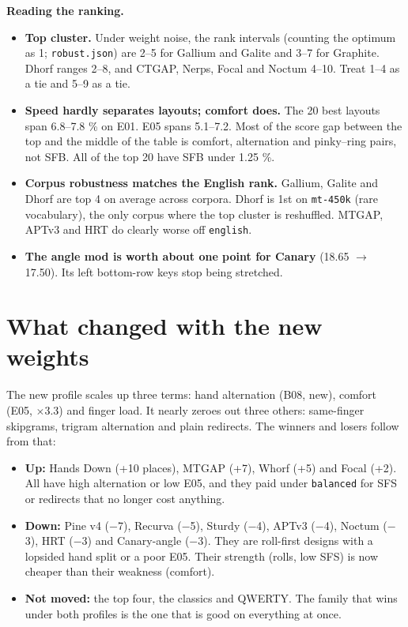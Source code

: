 \documentclass{gecko-paper}
\begin{document}
{\textbf{Reading the ranking.}

\begin{itemize}
\setlength{\itemsep}{1pt}\setlength{\parskip}{0pt}
\item
  \textbf{Top cluster.} Under weight noise, the rank intervals (counting the optimum as 1; \texttt{robust.json}) are 2–5 for Gallium and Galite and 3–7 for Graphite. Dhorf ranges 2–8, and CTGAP, Nerps, Focal and Noctum 4–10. Treat 1–4 as a tie and 5–9 as a tie.
\item
  \textbf{Speed hardly separates layouts; comfort does.} The 20 best layouts span 6.8–7.8 \% on E01. E05 spans 5.1–7.2. Most of the score gap between the top and the middle of the table is comfort, alternation and pinky–ring pairs, not SFB. All of the top 20 have SFB under 1.25 \%.
\item
  \textbf{Corpus robustness matches the English rank.} Gallium, Galite and Dhorf are top 4 on average across corpora. Dhorf is 1st on \texttt{mt-450k} (rare vocabulary), the only corpus where the top cluster is reshuffled. MTGAP, APTv3 and HRT do clearly worse off \texttt{english}.
\item
  \textbf{The angle mod is worth about one point for Canary} (18.65 $\to$ 17.50). Its left bottom-row keys stop being stretched.
\end{itemize}

\section{What changed with the new weights}

The new profile scales up three terms: hand alternation (B08, new), comfort (E05, $\times$3.3) and finger load. It nearly zeroes out three others: same-finger skipgrams, trigram alternation and plain redirects. The winners and losers follow from that:

\begin{itemize}
\setlength{\itemsep}{1pt}\setlength{\parskip}{0pt}
\item
  \textbf{Up:} Hands Down (+10 places), MTGAP (+7), Whorf (+5) and Focal (+2). All have high alternation or low E05, and they paid under \texttt{balanced} for SFS or redirects that no longer cost anything.
\item
  \textbf{Down:} Pine v4 ($-$7), Recurva ($-$5), Sturdy ($-$4), APTv3 ($-$4), Noctum ($-$3), HRT ($-$3) and Canary-angle ($-$3). They are roll-first designs with a lopsided hand split or a poor E05. Their strength (rolls, low SFS) is now cheaper than their weakness (comfort).
\item
  \textbf{Not moved:} the top four, the classics and QWERTY. The family that wins under both profiles is the one that is good on everything at once.
\end{itemize}

}
\end{document}
